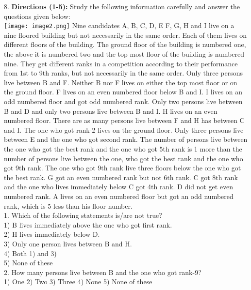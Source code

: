 \documentclass[
]{article}
\begin{document}
8. \textbf{Directions (1-5):} Study the following information carefully and answer the questions given
below:\\
\texttt{[image: image2.png]}
Nine candidates A, B, C, D, E F, G, H and I live on a nine floored building but not
necessarily in the same order. Each of them lives on different floors of the building. The
ground floor of the building is numbered one, the above it is numbered two and the top
most floor of the building is numbered nine. They get different ranks in a competition
according to their performance from 1st to 9th ranks, but not necessarily in the same order.
Only three persons live between B and F. Neither B nor F lives on either the top most floor
or on the ground floor. F lives on an even numbered floor below B and I. I lives on an odd
numbered floor and got odd numbered rank. Only two persons live between B and D and
only two persons live between B and I. H lives on an even numbered floor. There are as
many persons live between F and H has between C and I. The one who got rank-2 lives on
the ground floor. Only three persons live between E and the one who got second rank. The
number of persons live between the one who got the best rank and the one who got 5th rank
is 1 more than the number of persons live between the one, who got the best rank and the
one who got 9th rank. The one who got 9th rank live three floors below the one who got the
best rank. G got an even numbered rank but not 6th rank. C got 8th rank and the one who
lives immediately below C got 4th rank. D did not get even numbered rank. A lives on an
even numbered floor but got an odd numbered rank, which is 5 less than his floor number.\\

1. Which of the following statements is/are not true?\\
1) B lives immediately above the one who got first rank.\\
2) H lives immediately below D.\\
3) Only one person lives between B and H.\\
4) Both 1) and 3)\\
5) None of these\\

2. How many persons live between B and the one who got rank-9?\\
1) One \hspace{2mm}2) Two \hspace{2mm}3) Three \hspace{2mm}4) None \hspace{2mm}5) None of these\\
\end{document}
